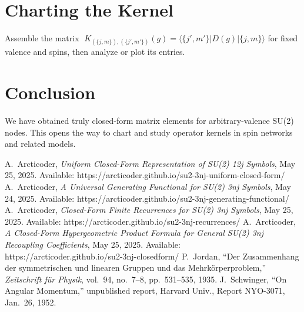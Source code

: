 \documentclass{article}
\begin{document}
\section{Charting the Kernel}
Assemble the matrix
\(\;K_{(\{j,m\}),(\{j',m'\})}(g)
=\langle\{j',m'\}|D(g)|\{j,m\}\rangle\)
for fixed valence and spins, then analyze or plot its entries.

\section{Conclusion}
We have obtained truly closed-form matrix elements for arbitrary-valence SU(2) nodes.  
This opens the way to chart and study operator kernels in spin networks and related models.

\begin{thebibliography}{9}
 A.~Arcticoder, \textit{Uniform Closed-Form Representation of SU(2) 12j Symbols}, May 25, 2025. Available: https://arcticoder.github.io/su2-3nj-uniform-closed-form/
 A.~Arcticoder, \textit{A Universal Generating Functional for SU(2) 3nj Symbols}, May 24, 2025. Available: https://arcticoder.github.io/su2-3nj-generating-functional/
 A.~Arcticoder, \textit{Closed-Form Finite Recurrences for SU(2) 3nj Symbols}, May 25, 2025. Available: https://arcticoder.github.io/su2-3nj-recurrences/
 A.~Arcticoder, \textit{A Closed-Form Hypergeometric Product Formula for General SU(2) 3nj Recoupling Coefficients}, May 25, 2025. Available: https://arcticoder.github.io/su2-3nj-closedform/
 P.~Jordan, ``Der Zusammenhang der symmetrischen und linearen Gruppen und das Mehrkörperproblem,'' \textit{Zeitschrift für Physik}, vol.~94, no.~7–8, pp.~531–535, 1935.
 J.~Schwinger, ``On Angular Momentum,'' unpublished report, Harvard Univ., Report NYO-3071, Jan.~26, 1952.
\end{thebibliography}
\end{document}
